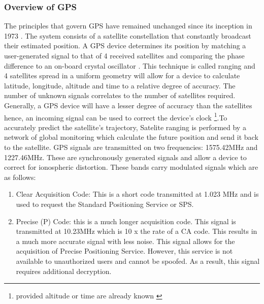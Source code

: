 \subsubsection{Overview of GPS}

The principles that govern GPS have remained unchanged since its inception in 1973 \cite{spilker1996global}. The system consists of a satellite constellation that constantly broadcast their estimated position. A GPS device determines its position by matching a user-generated signal to that of 4 received satellites and comparing the phase difference to an on-board crystal oscillator \cite{spilker1996global}. This technique is called ranging and 4 satellites spread in a uniform geometry will allow for a device to calculate latitude, longitude, altitude and time to a relative degree of accuracy. The number of unknown signals correlates to the number of satellites required. Generally, a GPS device will have a lesser degree of accuracy than the satellites hence, an incoming signal can be used to correct the device's clock \footnote{provided altitude or time are already known \cite{spilker1996global}}.To accurately predict the satellite's trajectory, Satelite ranging is performed by a network of global monitoring which calculate the future position and send it back to the satellite. GPS signals are transmitted on two frequencies: 1575.42MHz and 1227.46MHz\cite{spilker1996global}. These are synchronously generated signals and allow a device to correct for ionospheric distortion. These bands carry modulated signals which are as follows: \cite{spilker1996global}


\begin{enumerate}
    \item Clear Acquisition Code:  This is a short code transmitted at 1.023 MHz and is used to request the Standard Positioning Service or SPS.
    \item Precise (P) Code: this is a much longer acquisition code. This signal is transmitted at 10.23MHz which is 10 x the rate of a CA code. This results in a much more accurate signal with less noise. This signal allows for the acquisition of Precise Positioning Service. However, this service is not available to unauthorized users and cannot be spoofed. As a result, this signal requires additional decryption.    
\end{enumerate}

